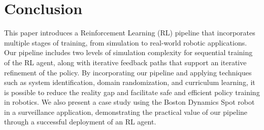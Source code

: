 \section{Conclusion}
\label{sec:conclusion}

This paper introduces a Reinforcement Learning (RL) pipeline that incorporates multiple stages of training, from simulation to real-world robotic applications. Our pipeline includes two levels of simulation complexity for sequential training of the RL agent, along with iterative feedback paths that support an iterative refinement of the policy. By incorporating our pipeline and applying techniques such as system identification, domain randomization, and curriculum learning, it is possible to reduce the reality gap and facilitate safe and efficient policy training in robotics. We also present a case study using the Boston Dynamics Spot robot in a surveillance application, demonstrating the practical value of our pipeline through a successful deployment of an RL agent. 